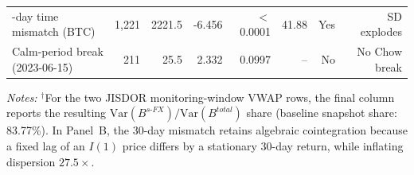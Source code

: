 \begin{table}[htbp]
\begin{tabular}{@{}>{\raggedright\arraybackslash}p{3.0cm}rrrrrrr@{}}
30-day time mismatch (BTC) & 1,221 & 2221.5 & -6.456 & $<$0.0001 & 41.88 & Yes & SD explodes \\
Calm-period break (2023-06-15) & 211 & 25.5 & 2.332 & 0.0997 & -- & No & No Chow break \\
\bottomrule
\end{tabular}\endgroup
\begin{minipage}{\textwidth}\footnotesize\vspace{3pt}
\emph{Notes:} $^\dagger$For the two JISDOR monitoring-window VWAP rows, the final column reports the resulting $\mathrm{Var}(B^{s\text{-}FX})/\mathrm{Var}(B^{total})$ share (baseline snapshot share: 83.77\%). In Panel~B, the 30-day mismatch retains algebraic cointegration because a fixed lag of an $I(1)$ price differs by a stationary 30-day return, while inflating dispersion $27.5\times$.
\end{minipage}
\end{table}
